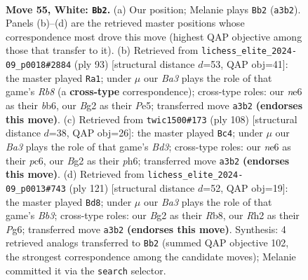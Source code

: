 \documentclass[11pt]{article}
\begin{document}
\clearpage

\begin{figure}[p]\centering
\begin{subfigure}{0.46\textwidth}\centering
\resizebox{\linewidth}{!}{%
\newchessgame
\chessboard[
  setfen={3r1b2/7p/p2pn1k1/P3p2p/2P1P3/BP3P2/3K2BR/8 w - - 6 55},
  showmover=false,
  pgfstyle=straightmove, color=movearrow, markmove={a3-b2}
]}
\caption{}
\end{subfigure}\hfill
\begin{subfigure}{0.46\textwidth}\centering
\resizebox{\linewidth}{!}{%
\newchessgame
\chessboard[
  setfen={8/8/1Bp2k2/P3p2b/1KP2p1p/1P3P2/5R1P/1r6 b - - 0 47},
  showmover=false,
  pgfstyle=straightmove, color=movearrow, markmove={b1-a1}
]}
\caption{}
\end{subfigure}
\\[4pt]
\begin{subfigure}{0.46\textwidth}\centering
\resizebox{\linewidth}{!}{%
\newchessgame
\chessboard[
  setfen={8/R7/2p2kbp/p2r1p2/Pp6/1P1B1KPP/2P5/8 w - - 6 55},
  showmover=false,
  pgfstyle=straightmove, color=movearrow, markmove={d3-c4}
]}
\caption{}
\end{subfigure}\hfill
\begin{subfigure}{0.46\textwidth}\centering
\resizebox{\linewidth}{!}{%
\newchessgame
\chessboard[
  setfen={1r3k2/5p2/Rb2p1p1/1N1p3p/P2P3P/4K1P1/5P2/8 b - - 55 61},
  showmover=false,
  pgfstyle=straightmove, color=movearrow, markmove={b6-d8}
]}
\caption{}
\end{subfigure}
\caption{\textbf{Move 55, White: \texttt{Bb2}.} (a) Our position; Melanie plays \texttt{Bb2} (\texttt{a3b2}). Panels (b)--(d) are the retrieved master positions whose correspondence most drove this move (highest QAP objective among those that transfer to it). (b) Retrieved from \texttt{lichess\_elite\_2024-09\_p0018\#2884} (ply 93) [structural distance $d$=53, QAP obj=41]: the master played \texttt{Ra1}; under $\mu$ our \emph{Ba3} plays the role of that game's \emph{Rb8} (a \textbf{cross-type} correspondence); cross-type roles: our \emph{n}e6 as their \emph{b}b6, our \emph{B}g2 as their \emph{P}e5; transferred move \texttt{a3b2} \textbf{(endorses this move)}. (c) Retrieved from \texttt{twic1500\#173} (ply 108) [structural distance $d$=38, QAP obj=26]: the master played \texttt{Bc4}; under $\mu$ our \emph{Ba3} plays the role of that game's \emph{Bd3}; cross-type roles: our \emph{n}e6 as their \emph{p}c6, our \emph{B}g2 as their \emph{p}h6; transferred move \texttt{a3b2} \textbf{(endorses this move)}. (d) Retrieved from \texttt{lichess\_elite\_2024-09\_p0013\#743} (ply 121) [structural distance $d$=52, QAP obj=19]: the master played \texttt{Bd8}; under $\mu$ our \emph{Ba3} plays the role of that game's \emph{Bb3}; cross-type roles: our \emph{B}g2 as their \emph{R}b8, our \emph{R}h2 as their \emph{P}g6; transferred move \texttt{a3b2} \textbf{(endorses this move)}. Synthesis: 4 retrieved analogs transferred to \texttt{Bb2} (summed QAP objective 102, the strongest correspondence among the candidate moves); Melanie committed it via the \texttt{search} selector.}
\label{fig:thought-m108}
\end{figure}
\end{document}

